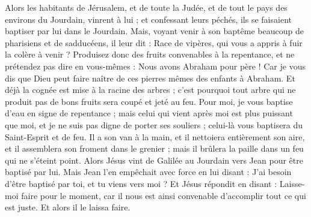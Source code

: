 \begin{multicols}{2}
Alors les habitants de Jérusalem, et de toute la Judée, et de tout le pays des environs du Jourdain, vinrent à lui ;
et confessant leurs péchés, ils se faisaient baptiser par lui dans le Jourdain.
Mais, voyant venir à son baptême beaucoup de pharisiens et de sadducéens, il leur dit : Race de vipères, qui vous a appris à fuir la colère à venir ?
Produisez donc des fruits convenables à la repentance,
et ne prétendez pas dire en vous-mêmes : Nous avons Abraham pour père ! Car je vous dis que Dieu peut faire naître de ces pierres mêmes des enfants à Abraham.
Et déjà la cognée est mise à la racine des arbres ; c'est pourquoi tout arbre qui ne produit pas de bons fruits sera coupé et jeté au feu.
Pour moi, je vous baptise d'eau en signe de repentance ; mais celui qui vient après moi est plus puissant que moi, et je ne suis pas digne de porter ses souliers ; celui-là vous baptisera du Saint-Esprit et de feu{}.
Il a son van à la main, et il nettoiera entièrement son aire, et il assemblera son froment dans le grenier ; mais il brûlera la paille dans un feu qui ne s'éteint point.
Alors Jésus vint de Galilée au Jourdain vers Jean pour être baptisé par lui.
Mais Jean l'en empêchait avec force en lui disant : J'ai besoin d'être baptisé par toi, et tu viens vers moi ?
Et Jésus répondit en disant : Laisse-moi faire pour le moment, car il nous est ainsi convenable d'accomplir tout ce qui est juste. Et alors il le laissa faire.

\end{multicols}
